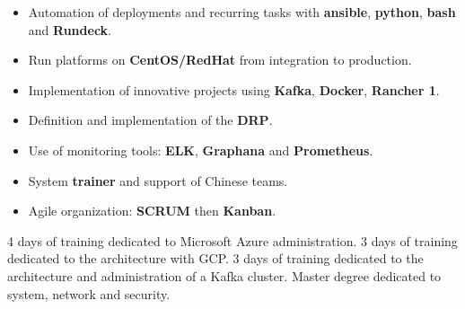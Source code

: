 \documentclass[
	a4paper,
	maincolor=cvartifakt,
	sidecolor=cvgray,
	sidebartextcolor=cvwhite,
	sectioncolor=cvartifakt,
	subsectioncolor=cvgray,
	sidebarwidth=0.36\paperwidth,
    topbottommargin=0.04\paperheight,
]{fortysecondscv}
\begin{document}
\begin{cvtable}[2]
{	    \begin{itemize}
            \item Automation of deployments and recurring tasks with \textbf{ansible}, \textbf{python}, \textbf{bash} and \textbf{Rundeck}.
            \item Run platforms on \textbf{CentOS/RedHat} from integration to production.
            \item Implementation of innovative projects using \textbf{Kafka}, \textbf{Docker}, \textbf{Rancher 1}.
            \item Definition and implementation of the \textbf{DRP}.
            \item Use of monitoring tools: \textbf{ELK}, \textbf{Graphana} and \textbf{Prometheus}.
            \item System \textbf{trainer} and support of Chinese teams.
            \item Agile organization: \textbf{SCRUM} then \textbf{Kanban}.
        \end{itemize}
		}
\end{cvtable}

\begin{cvtable}[2]
		{4 days of training dedicated to Microsoft Azure administration.}
		{3 days of training dedicated to the architecture with GCP.}
		{3 days of training dedicated to the architecture and administration of a Kafka cluster.}
		{Master degree dedicated to system, network and security.}
\end{cvtable}

\vspace{-11pt}
\end{document}
